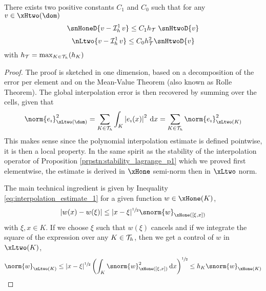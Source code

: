 \begin{prpstn}
\label{prpstn:interpolation_p1}
There exists two positive constants $C_1$ and $C_0$ such that for any $v\in\xHtwo(\dom)$
\begin{equation}
\snHoneD{v - \Lgrh{1}v}  \leq C_1 \sizeT\;\snHtwoD{v}
\end{equation}
\begin{equation}
\nLtwo{v - \Lgrh{1}v}  \leq C_0 \sizeT^2 \snHtwoD{v}
\end{equation}
with $h_{\mathcal T} = \max_{K\in{\mathcal T}_h}(h_K)$
\end{prpstn}
\begin{proof}
The proof is sketched in one dimension, based on a decomposition of the error per element and on the Mean-Value Theorem (also known as Rolle Theorem).
The global interpolation error is then recovered by summing over the cells, given that
\begin{equation*}
\norm{e_\imath}^2_{\xLtwo(\dom)} = \sum_{K\in\meshT} \int_K\Abs{e_\imath(x)}^2 \md x = \sum_{K\in\meshT} \norm{e_\imath}^2_{\xLtwo(K)}
\end{equation*}
This makes sense since the polynomial interpolation estimate is defined pointwise, it is then a local property.
In the same spirit as the stability of the interpolation operator of Proposition \ref{prpstn:stability_lagrange_p1} which we proved first elementwise, the estimate is derived in $\xHone$ semi-norm then in $\xLtwo$ norm.

\medskip
The main technical ingredient is given by Inequality \eqref{eq:interpolation_estimate_1} for a given function $w\in\xHone(K)$,
\begin{equation}\label{eq:interpolation_estimate_trick_1}
\Abs{w(x) - w(\xi)} \leq \displaystyle|x - \xi|^{\sfrac{1}{2}}\snorm{w}_{\xHone([\xi, x])}
\end{equation}
with $\xi, x\in K$.
If we choose $\xi$ such that $w(\xi)$ cancels and if we integrate the square of the expression over any $K\in{\mathcal T}_h$, then we get a control of $w$ in $\xLtwo(K)$,
\begin{equation}\label{eq:interpolation_estimate_trick_2}
\norm{w}_{\xLtwo(K)} \leq \displaystyle|x - \xi|^{\sfrac{1}{2}}\left(\int_K \snorm{w}^2_{\xHone([\xi, x])}\md x\right)^{\sfrac{1}{2}} \leq h_K\snorm{w}_{\xHone(K)}
\end{equation}


\end{proof}
